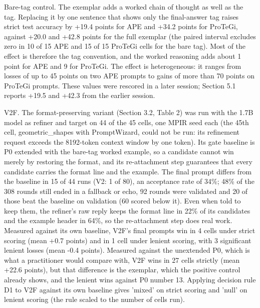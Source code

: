 \documentclass{ieeeaccess}
\begin{document}
Bare-tag control. The exemplar adds a worked chain of thought as well as the tag. Replacing it by one sentence that shows only the final-answer tag raises strict test accuracy by +19.4 points for APE and +34.2 points for ProTeGi, against +20.0 and +42.8 points for the full exemplar (the paired interval excludes zero in 10 of 15 APE and 15 of 15 ProTeGi cells for the bare tag). Most of the effect is therefore the tag convention, and the worked reasoning adds about 1 point for APE and 9 for ProTeGi. The effect is heterogeneous: it ranges from losses of up to 45 points on two APE prompts to gains of more than 70 points on ProTeGi prompts. These values were rescored in a later session; Section 5.1 reports +19.5 and +42.3 from the earlier session.

V2F. The format-preserving variant (Section 3.2, Table 2) was run with the 1.7B model as refiner and target on 44 of the 45 cells, one MPIR seed each (the 45th cell, geometric\_\allowbreak{}shapes with PromptWizard, could not be run: its refinement request exceeds the 8192-token context window by one token). Its gate baseline is P0 extended with the bare-tag worked example, so a candidate cannot win merely by restoring the format, and its re-attachment step guarantees that every candidate carries the format line and the example. The final prompt differs from the baseline in 15 of 44 runs (V2: 1 of 80), an acceptance rate of 34\%; 48\% of the 308 rounds still ended in a fallback or echo, 92 rounds were validated and 20 of those beat the baseline on validation (60 scored below it). Even when told to keep them, the refiner's raw reply keeps the format line in 22\% of its candidates and the example header in 64\%, so the re-attachment step does real work. Measured against its own baseline, V2F's final prompts win in 4 cells under strict scoring (mean +0.7 points) and in 1 cell under lenient scoring, with 3 significant lenient losses (mean -0.4 points). Measured against the unextended P0, which is what a practitioner would compare with, V2F wins in 27 cells strictly (mean +22.6 points), but that difference is the exemplar, which the positive control already shows, and the lenient wins against P0 number 13. Applying decision rule D1 to V2F against its own baseline gives 'mixed' on strict scoring and 'null' on lenient scoring (the rule scaled to the number of cells run).
\end{document}
